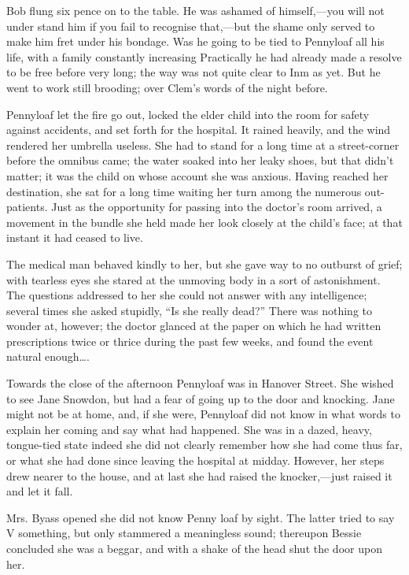 Bob flung six pence on to the table. He was ashamed of himself,---you
will not under stand him if you fail to recognise that,---but the shame
only served to make him fret under his bondage. Was he going to be tied
to Pennyloaf all his life, with a family constantly increasing
Practically he had already made {}a resolve to be free before very long;
the way was not quite clear to Inm as yet. But he went to work still
brooding; over Clem's words of the night before.

Pennyloaf let the fire go out, locked the elder child into the room for
safety against accidents, and set forth for the hospital. It rained
heavily, and the wind rendered her umbrella useless. She had to stand
for a long time at a street-corner before the omnibus came; the water
soaked into her leaky shoes, but that didn't matter; it was the child on
whose account she was anxious. Having reached her destination, she sat
for a long time waiting her turn among the numerous out-patients. Just
as the opportunity for passing into the doctor's room arrived, a
movement in the bundle she held made her look closely at the child's
face; at that instant it had ceased to live.

The medical man behaved kindly to her, but she gave way to no outburst
of grief; with tearless eyes she stared at the unmoving body in a sort
of astonishment. The questions addressed to her she could not answer
with any intelligence; several times she asked {}stupidly, ``Is she
really dead?'' There was nothing to wonder at, however; the doctor
glanced at the paper on which he had written prescriptions twice or
thrice during the past few weeks, and found the event natural
enough\ldots{}.

Towards the close of the afternoon Pennyloaf was in Hanover Street. She
wished to see Jane Snowdon, but had a fear of going up to the door and
knocking. Jane might not be at home, and, if she were, Pennyloaf did not
know in what words to explain her coming and say what had happened. She
was in a dazed, heavy, tongue-tied state indeed she did not clearly
remember how she had come thus far, or what she had done since leaving
the hospital at midday. However, her steps drew nearer to the house, and
at last she had raised the knocker,---just raised it and let it fall.

Mrs. Byass opened she did not know Penny loaf by sight. The latter tried
to say V something, but only stammered a meaningless sound; thereupon
Bessie concluded she was a beggar, and with a shake of the head shut the
door upon her.


